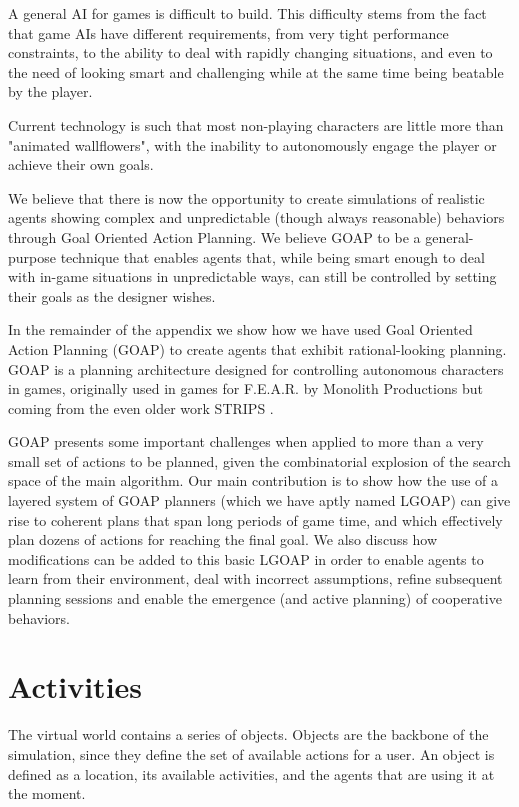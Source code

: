 A general AI for games is difficult to build. This difficulty stems from the fact that game AIs have different requirements, from very tight performance constraints, to the ability to deal with rapidly changing situations, and even to the need of looking smart and challenging while at the same time being beatable by the player. 

Current technology is such that most non-playing characters are little more than "animated wallflowers", with the inability to autonomously engage the player or achieve their own goals.

We believe that there is now the opportunity to create simulations of realistic agents showing complex and unpredictable (though always reasonable) behaviors through Goal Oriented Action Planning. We believe GOAP to be a general-purpose technique that enables agents that, while being smart enough to deal with in-game situations in unpredictable ways, can still be controlled by setting their goals as the designer wishes.

In the remainder of the appendix we show how we have used Goal Oriented Action Planning (GOAP) \cite{APPENDIX_C_GOAP_BOOK} to create agents that exhibit rational-looking planning. GOAP is a planning architecture designed for controlling autonomous characters in games, originally used in games for F.E.A.R. by Monolith Productions \cite{APPENDIX_C_GOAP_FEAR} but coming from the even older work STRIPS \cite{APPENDIX_C_STRIPS}. 

GOAP presents some important challenges when applied to more than a very small set of actions to be planned, given the combinatorial explosion of the search space of the main algorithm. Our main contribution is to show how the use of a layered system of GOAP planners (which we have aptly named LGOAP) can give rise to coherent plans that span long periods of game time, and which effectively plan dozens of actions for reaching the final goal. We also discuss how modifications can be added to this basic LGOAP in order to enable agents to learn from their environment, deal with incorrect assumptions, refine subsequent planning sessions and enable the emergence (and active planning) of cooperative behaviors.


\section{Activities}
\label{sec:activities}

The virtual world contains a series of objects. Objects are the backbone of the simulation, since they define the set of available actions for a user. An object is defined as a location, its available activities, and the agents that are using it at the moment.

